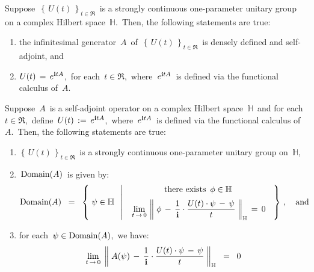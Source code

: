 \vskip 0.3cm
\begin{theorem}
\mbox{}
\vskip 0.05cm
\noindent
Suppose \,$\left\{\,U(t)\,\right\}_{t\in\Re}$\, is a strongly continuous one-parameter
unitary group on a complex Hilbert space \,$\mathbb{H}$.\,
Then, the following statements are true:
\begin{enumerate}
\item
	the infinitesimal generator \,$A$\, of \,$\left\{\,U(t)\,\right\}_{t\in\Re}$\,
	is densely defined and {\color{red}self-adjoint}, and
\item
	$U(t) \, = \, e^{\mathbf{i} t A}$,\,
	for each \,$t \in \Re$,\,
	where \,$e^{\mathbf{i} t A}$\, is defined via the functional calculus of \,$A$.\,
\end{enumerate}
\end{theorem}

\vskip 0.3cm
\begin{proposition}
\mbox{}
\vskip 0.05cm
\noindent
Suppose \,$A$\, is a {\color{red}self-adjoint} operator on a complex Hilbert space \,$\mathbb{H}$\,
and for each \,$t \in \Re$,\, define \,$U(t) \,:=\, e^{\mathbf{i} t A}$,\,
where \,$e^{\mathbf{i} t A}$\, is defined via the functional calculus of \,$A$.\,
Then, the following statements are true:
\begin{enumerate}
\item
	$\left\{\,U(t)\,\right\}_{t\in\Re}$\, is
	a strongly continuous one-parameter unitary group on \,$\mathbb{H}$,\,
\item
	\,$\textnormal{Domain}(A)$\, is given by:
	\begin{equation*}
	\textnormal{Domain}(A)
	\;\; = \;\;
		\left\{\;
			\psi \in \mathbb{H}
			\;\;\left\vert\;\;
			\begin{array}{c}
			\underset{{\color{white}1}}{\textnormal{there exists \,$\phi \in \mathbb{H}$\,}}
			\\
			\underset{t\,\rightarrow\,0}{\lim}\,
			\left\Vert\;
				\phi
				\,-\,
				\dfrac{1}{\i}\cdot\dfrac{
				U(t) \cdot \psi \,-\, \psi
				}{t}
				\;\right\Vert_{\mathbb{H}}
			\,=\,0
			\end{array}
			\right.
			\;\right\}\,,
	\quad
	\textnormal{and}
	\end{equation*}
\item
	for each \,$\psi \in \textnormal{Domain}(A)$,\, we have:
	\begin{equation*}
	\underset{t\,\rightarrow\,0}{\lim}\;
	\left\Vert\;
		A(\psi)
		\,-\,
		\dfrac{1}{\mathbf{i}}\cdot\dfrac{
			U(t) \cdot \psi \,-\, \psi
			}{t}
		\;\right\Vert_{\mathbb{H}}
	\;\; = \;\;
		0
	\end{equation*}
\end{enumerate}
\end{proposition}

